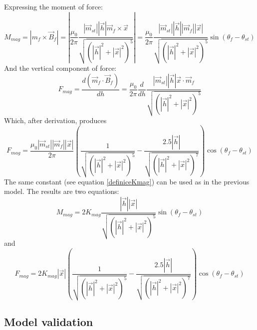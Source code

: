 \documentclass[10pt,a4paper]{article}
\begin{document}
Expressing the moment of force:
\begin{equation}
M_{mag} = |m_f \times \vec{B}_f| = |\frac{\mu_{0}}{2 \pi}  \frac{|\vec{m}_{st}|| \vec{h}|\vec{m}_f \times\vec{x}}{\sqrt{\left(|\vec{h}|^2+|\vec{x}|^2\right)^5}} |=  \frac{\mu_{0}}{2 \pi}  \frac{|\vec{m}_{st}|| \vec{h}||\vec{m}_f|| \vec{x}|}{\sqrt{\left(|\vec{h}|^2+|\vec{x}|^2\right)^5}} \sin(\theta_f - \theta_{st})
\label{moment2dipoly}
\end{equation}
And the vertical component of force:
\begin{equation}
F_{mag} = \frac{d \left(\vec{ m}_f \cdot \vec{B}_f \right)}{d h} = \frac{\mu_{0} }{2 \pi} \frac{d}{dh} \frac{|\vec{m}_{st} | |\vec{h}| \vec{x} \cdot \vec{m}_f}{\sqrt{\left(|\vec{h}|^2+|\vec{x}|^2\right)^5}}
\label{sila2dipoly}
\end{equation}
Which, after derivation, produces
\begin{equation}
 F_{mag} = \frac{\mu_{0} |\vec{m}_{st}||\vec{m}_f|| \vec{x}|}{2 \pi}  \left( \frac{1}{\sqrt{\left(|\vec{h}|^2+|\vec{x}|^2\right)^5}} - \frac{2.5|\vec{h}|}{\sqrt{\left(|\vec{h}|^2+|\vec{x}|^2\right)^7}} \right) \cos(\theta_f - \theta_{st})
 \label{sila2dipoly2}
 \end{equation}
The same constant (see equation \ref{definiceKmag}) can be used as in the previous model. The results are two equations:
\begin{equation}
 M_{mag} = 2 K_{mag}\frac{| \vec{h}|| \vec{x}|}{\sqrt{\left(|\vec{h}|^2+|\vec{x}|^2\right)^5}} \sin(\theta_f - \theta_{st})
 \label{2dipolymoment}
 \end{equation}
and
\begin{equation}
 F_{mag} = 2 K_{mag} |\vec{x}|\left( \frac{1}{\sqrt{\left(|\vec{h}|^2+|\vec{x}|^2\right)^5}} - \frac{2.5|\vec{h}|}{\sqrt{\left(|\vec{h}|^2+|\vec{x}|^2\right)^7}} \right) \cos(\theta_f - \theta_{st}) 
 \label{magsila2dipoly}
 \end{equation}

\subsection{Model validation}
\end{document}
